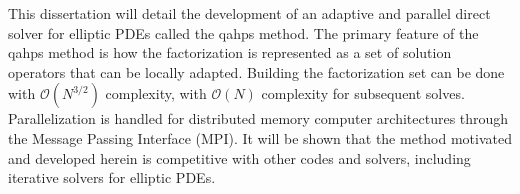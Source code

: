 This dissertation will detail the development of an adaptive and parallel direct solver for elliptic PDEs called the \gls{qahps} method. The primary feature of the \gls{qahps} method is how the factorization is represented as a set of solution operators that can be locally adapted. Building the factorization set can be done with $\mathcal{O}(N^{3/2})$ complexity, with $\mathcal{O}(N)$ complexity for subsequent solves. Parallelization is handled for distributed memory computer architectures through the Message Passing Interface (MPI). It will be shown that the method motivated and developed herein is competitive with other codes and solvers, including iterative solvers for elliptic PDEs.